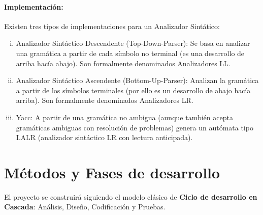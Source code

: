 \paragraph*{Implementación:} Existen tres tipos de implementaciones para un Analizador Sintático:

\begin{enumerate}[i.]

\item Analizador Sintáctico Descendente (Top-Down-Parser): Se basa en analizar 
una gramática a partir de cada símbolo no terminal (es una desarrollo de arriba 
hacía abajo). Son formalmente denominados Analizadores LL.

\item Analizador Sintáctico Ascendente (Bottom-Up-Parser): Analizan la gramática 
a partir de los símbolos terminales (por ello es un desarrollo de abajo 
hacía arriba). Son formalmente denominados Analizadores LR.

\item {}Yacc: A partir de una gramática no ambigua (aunque también acepta 
gramáticas ambiguas con resolución de problemas) genera un autómata tipo LALR 
(analizador sintáctico LR con lectura anticipada). 

\end{enumerate}


\section{Métodos y Fases de desarrollo}

El proyecto se construirá siguiendo el modelo clásico de \textbf{Ciclo de 
desarrollo en Cascada}: Análisis, Diseño, Codificación y Pruebas.

